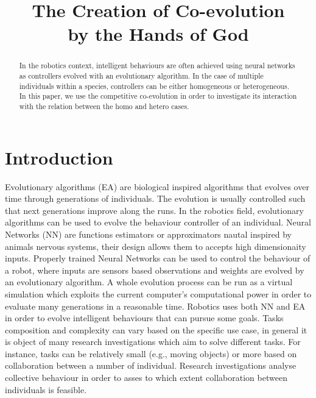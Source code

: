 \documentclass[conference]{IEEEtran}
\begin{document}
\title{The Creation of Co-evolution \\ by the Hands of God}



\author{
}



\maketitle


\begin{abstract}
In the robotics context, intelligent behaviours are often achieved using neural networks as controllers evolved with an evolutionary algorithm. 
In the case of multiple individuals within a species, controllers can be either homogeneous or heterogeneous. 
In this paper, we use the competitive co-evolution in order to investigate its interaction with the relation between the homo and hetero cases. 
\end{abstract}


\IEEEpeerreviewmaketitle


\section{Introduction}
Evolutionary algorithms (EA) are biological inspired algorithms that evolves over time through generations of individuals. 
The evolution is usually controlled such that next generations improve along the runs.
In the robotics field, evolutionary algorithms can be used to evolve the  behaviour controller of an individual.
Neural Networks (NN) are functions estimators or approximators nautal inspired by animals nervous systems, their design allows them to accepts high dimensionaity inputs.   
Properly trained Neural Networks can be used to control the behaviour of a robot, where inputs are sensors based observations and weights are evolved by an evolutionary algorithm.
A whole evolution process can be run as a virtual simulation which exploits the current computer's computational power in order to evaluate many generations in a reasonable time.
Robotics uses both NN and EA in order to evolve intelligent behaviours that can pursue some goals.
Tasks composition and complexity can vary based on the specific use case, in general it is object of many research investigations which aim to solve different tasks.
For instance, tasks can be relatively small (e.g., moving objects) or more based on collaboration between a number of individual.
Research investigations analyse collective behaviour in order to asses to which extent collaboration between individuals is feasible.  
\end{document}
